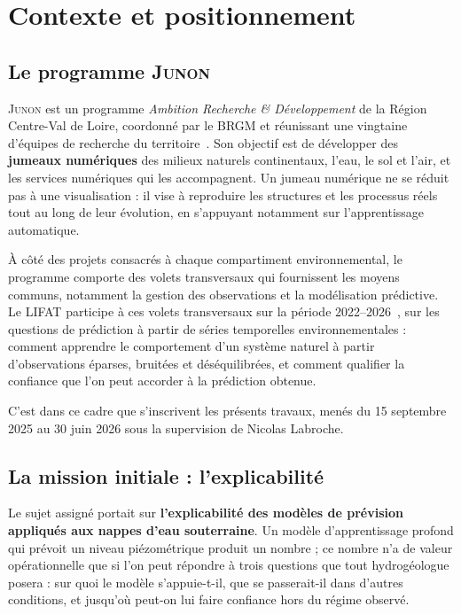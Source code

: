 \chapter{Contexte et positionnement}
\label{ch:contexte}


\section{Le programme \textsc{Junon}}

\textsc{Junon} est un programme \emph{Ambition Recherche \& Développement} de la Région
Centre-Val de Loire, coordonné par le BRGM et réunissant une vingtaine d'équipes de recherche du
territoire~\cite{brgm_junon_programme,brgm_junon_lancement}. Son objectif est de développer des
\textbf{jumeaux numériques} des milieux naturels continentaux, l'eau, le sol et l'air, et les
services numériques qui les accompagnent. Un jumeau numérique ne se réduit pas à une
visualisation : il vise à reproduire les structures et les processus réels tout au long de leur
évolution, en s'appuyant notamment sur l'apprentissage automatique.

À côté des projets consacrés à chaque compartiment environnemental, le programme comporte des
volets transversaux qui fournissent les moyens communs, notamment la gestion des observations
et la modélisation prédictive. Le LIFAT participe à ces volets transversaux sur la période
2022--2026~\cite{lifat_junon}, sur les questions de prédiction à partir de séries temporelles
environnementales : comment apprendre le comportement d'un système naturel à partir
d'observations éparses, bruitées et déséquilibrées, et comment qualifier la confiance que l'on
peut accorder à la prédiction obtenue.

C'est dans ce cadre que s'inscrivent les présents travaux, menés du 15 septembre 2025 au 30 juin
2026 sous la supervision de Nicolas Labroche.

\section{La mission initiale : l'explicabilité}

Le sujet assigné portait sur \textbf{l'explicabilité des modèles de prévision appliqués aux
nappes d'eau souterraine}. Un modèle d'apprentissage
profond qui prévoit un niveau piézométrique produit un nombre ; ce nombre n'a de valeur
opérationnelle que si l'on peut répondre à trois questions que tout hydrogéologue posera :
sur quoi le modèle s'appuie-t-il, que se passerait-il dans d'autres conditions, et jusqu'où
peut-on lui faire confiance hors du régime observé.

